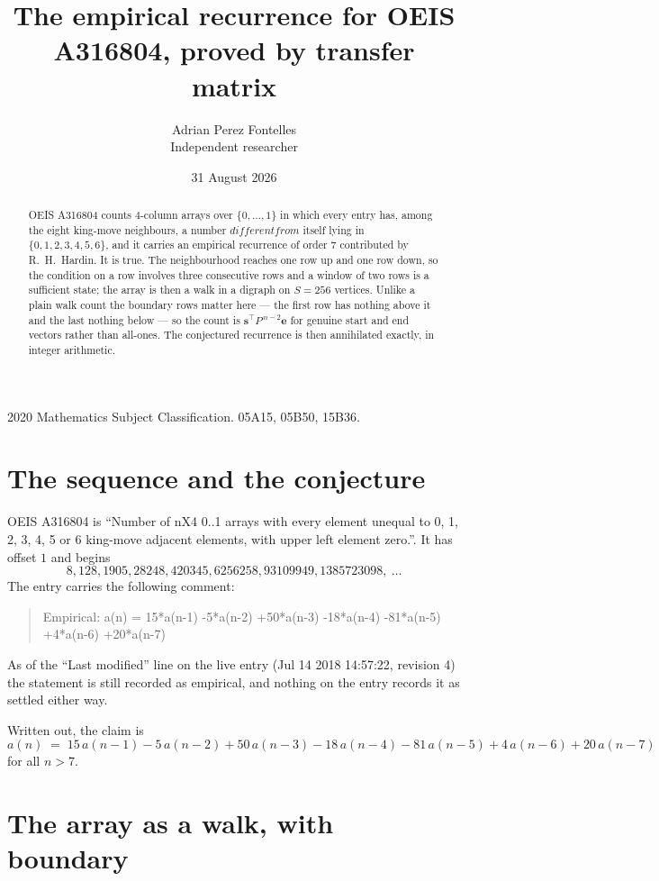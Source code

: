 \documentclass[11pt,a4paper]{article}
\title{The empirical recurrence for OEIS A316804, proved by transfer matrix}
\author{Adrian Perez Fontelles\\ \small Independent researcher}
\date{31 August 2026}
\theoremstyle{plain}
\theoremstyle{definition}
\begin{document}
\maketitle

\begin{abstract}
OEIS A316804 counts $4$-column arrays over $\{0,\dots,1\}$ in which every entry has,
among the eight king-move neighbours, a number $different from$ itself lying in $\{0,1,2,3,4,5,6\}$, and it carries an empirical
recurrence of order $7$ contributed by R.~H.~Hardin. It is true. The neighbourhood
reaches one row up and one row down, so the condition on a row involves three consecutive
rows and a window of two rows is a sufficient state; the array is then a walk in a digraph
on $S=256$ vertices. Unlike a plain walk count the boundary rows matter here --- the first
row has nothing above it and the last nothing below --- so the count is
$\mathbf{s}^{\!\top}P^{\,n-2}\mathbf{e}$ for genuine start and end vectors rather than
all-ones. The conjectured recurrence is then annihilated exactly, in integer arithmetic.
\end{abstract}

\noindent\small 2020 Mathematics Subject Classification. 05A15, 05B50, 15B36.\normalsize

\section{The sequence and the conjecture}

OEIS A316804 is ``Number of nX4 0..1 arrays with every element unequal to 0, 1, 2, 3, 4, 5 or 6 king-move adjacent elements, with upper left element zero.''. It has offset
$1$ and begins
\[
8, 128, 1905, 28248, 420345, 6256258, 93109949, 1385723098,\ \dots
\]
The entry carries the following comment:
\begin{quote}\small
Empirical: a(n) = 15*a(n-1) -5*a(n-2) +50*a(n-3) -18*a(n-4) -81*a(n-5) +4*a(n-6) +20*a(n-7)
\end{quote}
As of the ``Last modified'' line on the live entry (Jul 14 2018 14:57:22, revision
4) the statement is still recorded as empirical, and nothing on the entry
records it as settled either way.

Written out, the claim is
\begin{equation}\label{eq:conj}
a(n)\;=\;15\,a(n-1) - 5\,a(n-2) + 50\,a(n-3) - 18\,a(n-4) - 81\,a(n-5) + 4\,a(n-6) + 20\,a(n-7)
\end{equation}
for all $n>7$.

\section{The array as a walk, with boundary}
\end{document}

